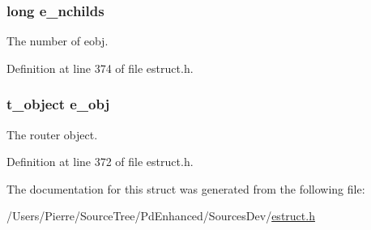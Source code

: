 \hypertarget{struct__erouter_aae6cef9e2d4de46e690ad868953d0923}{
\subsubsection[{e\-\_\-nchilds}]{\setlength{\rightskip}{0pt plus 5cm}long e\-\_\-nchilds}}\label{struct__erouter_aae6cef9e2d4de46e690ad868953d0923}
The number of eobj. 

Definition at line 374 of file estruct.\-h.

\hypertarget{struct__erouter_a337dd8dd1771ebe57e90886d4fdfe92d}{
\subsubsection[{e\-\_\-obj}]{\setlength{\rightskip}{0pt plus 5cm}t\-\_\-object e\-\_\-obj}}\label{struct__erouter_a337dd8dd1771ebe57e90886d4fdfe92d}
The router object. 

Definition at line 372 of file estruct.\-h.



The documentation for this struct was generated from the following file\-:\begin{DoxyCompactItemize}
\item 
/\-Users/\-Pierre/\-Source\-Tree/\-Pd\-Enhanced/\-Sources\-Dev/\hyperlink{estruct_8h}{estruct.\-h}\end{DoxyCompactItemize}
